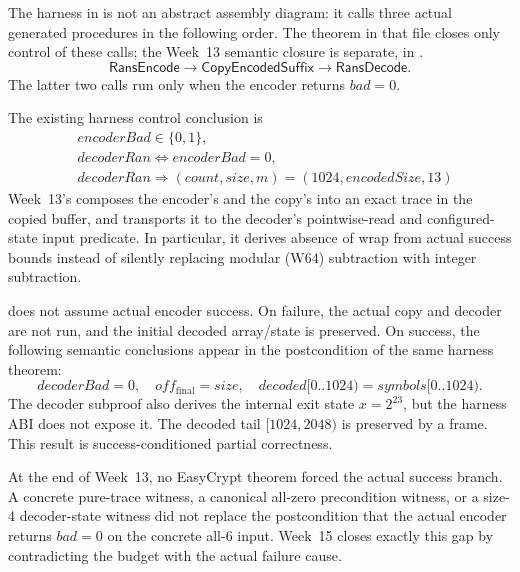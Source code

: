 The harness in  is not an abstract assembly
diagram: it calls three actual generated procedures in the following order.
The theorem in that file closes only control of these calls; the Week~13
semantic closure is separate, in .
\[
\mathsf{RansEncode}
\longrightarrow
\mathsf{CopyEncodedSuffix}
\longrightarrow
\mathsf{RansDecode}.
\]
The latter two calls run only when the encoder returns \(bad=0\).

The existing harness control conclusion is
\[
\begin{aligned}
  &\mathit{encoderBad}\in\{0,1\},\\
  &\mathit{decoderRan}\Longleftrightarrow\mathit{encoderBad}=0,\\
  &\mathit{decoderRan}\Longrightarrow
    (count,size,m)=(1024,\mathit{encodedSize},13)
\end{aligned}
\]
Week~13's  composes the encoder's
 and the copy's  into an exact
trace in the copied buffer, and transports it to the decoder's pointwise-read
and configured-state input predicate. In particular, it derives absence of wrap
from actual success bounds instead of silently replacing modular (W64)
subtraction with integer subtraction.

\begin{verified}
 does not assume actual
encoder success. On failure, the actual copy and decoder are not run, and the
initial decoded array/state is preserved. On success, the following semantic
conclusions appear in the postcondition of the same harness theorem:
\[
  \mathit{decoderBad}=0,\quad
  off_{\mathrm{final}}=size,\quad
  decoded[0..1024)=symbols[0..1024).
\]
The decoder subproof also derives the internal exit state \(x=2^{23}\), but the
harness ABI does not expose it. The decoded tail \([1024,2048)\) is preserved
by a frame. This result is success-conditioned partial correctness.
\end{verified}

At the end of Week~13, no EasyCrypt theorem forced the actual success branch.
A concrete pure-trace witness, a canonical all-zero precondition witness, or a
size-4 decoder-state witness did not replace the postcondition that the actual
encoder returns \(bad=0\) on the concrete all-6 input. Week~15 closes exactly
this gap by contradicting the budget with the actual failure cause.

